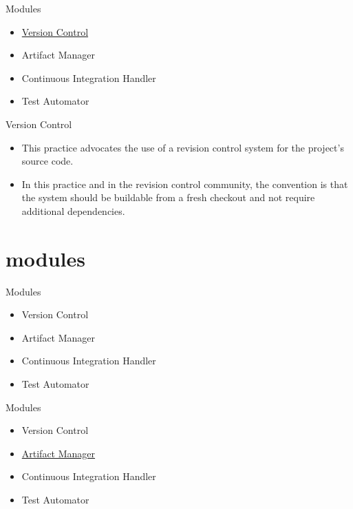 \documentclass{beamer}
\begin{document}
\begin{frame}{Modules}
\begin{itemize}
\item \underline{Version Control}
\item Artifact Manager
\item Continuous Integration Handler
\item Test Automator

\end{itemize}

\end{frame}

\begin{frame}{Version Control}
\begin{itemize}
\item This practice advocates the use of a revision control system for the project’s source code.
\vspace{0.5 cm}
\item In this
practice and in the revision control community, the convention is that the system should
be buildable from a fresh checkout and not require additional dependencies.
\end{itemize}
\end{frame}


\section{modules}
\begin{frame}{Modules}
\begin{itemize}
\item Version Control
\item Artifact Manager
\item Continuous Integration Handler
\item Test Automator

\end{itemize}

\end{frame}

\begin{frame}{Modules}
\begin{itemize}
\item Version Control
\item \underline{Artifact Manager}
\item Continuous Integration Handler
\item Test Automator

\end{itemize}

\end{frame}
\end{document}
